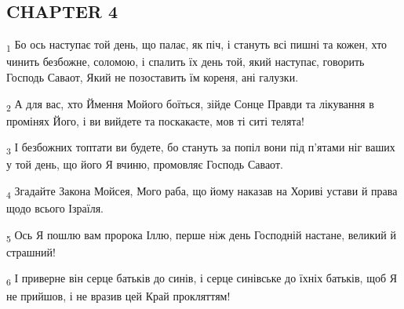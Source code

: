 \subsection{CHAPTER 4}
\begin{tcolorbox}
\textsubscript{1} Бо ось наступає той день, що палає, як піч, і стануть всі пишні та кожен, хто чинить безбожне, соломою, і спалить їх день той, який наступає, говорить Господь Саваот, Який не позоставить їм кореня, ані галузки.
\end{tcolorbox}
\begin{tcolorbox}
\textsubscript{2} А для вас, хто Ймення Мойого боїться, зійде Сонце Правди та лікування в промінях Його, і ви вийдете та поскакаєте, мов ті ситі телята!
\end{tcolorbox}
\begin{tcolorbox}
\textsubscript{3} І безбожних топтати ви будете, бо стануть за попіл вони під п'ятами ніг ваших у той день, що його Я вчиню, промовляє Господь Саваот.
\end{tcolorbox}
\begin{tcolorbox}
\textsubscript{4} Згадайте Закона Мойсея, Мого раба, що йому наказав на Хориві устави й права щодо всього Ізраїля.
\end{tcolorbox}
\begin{tcolorbox}
\textsubscript{5} Ось Я пошлю вам пророка Іллю, перше ніж день Господній настане, великий й страшний!
\end{tcolorbox}
\begin{tcolorbox}
\textsubscript{6} І приверне він серце батьків до синів, і серце синівське до їхніх батьків, щоб Я не прийшов, і не вразив цей Край прокляттям!
\end{tcolorbox}
